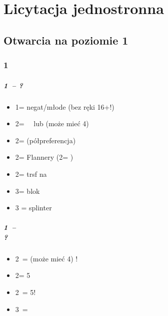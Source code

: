 \documentclass[12pt, a4paper]{report}
\begin{document}
\part*{\colorbox{RoyalPurple!30}{Licytacja jednostronna}}
 {

    \chapter*{\colorbox{Plum!30}{Otwarcia na poziomie 1}}
     {

        \section*{\colorbox{blue!30}{1\clubs}}
         {  
            \subsubsection*{1\clubs\ -- ?}
            \begin{itemize}
                \item 1\diams = negat/młode (bez ręki 16+!)
                \item 2\clubs = \gf\ \nat\ lub \bal (może mieć 4\major)
                \item 2\diams = \gf \nat (półpreferencja)
                \item 2\hearts = Flannery (2\nt = \lsf)
                \item 2\spades = trsf na \nt\ \invp
                \item 3\clubs = blok
                \item 3 = splinter
            \end{itemize}

            \subsubsection*{1\clubs\ -- \alrts{2\clubs} \\ ?}
            \begin{itemize}
                \item 2\diams\ = \bal (może mieć 4\major) !
                \item 2\major = 5\major
                \item 2\nt\ = 5\diams !
                \item 3\clubs\ = \clubs
            \end{itemize}

}}}
\end{document}
